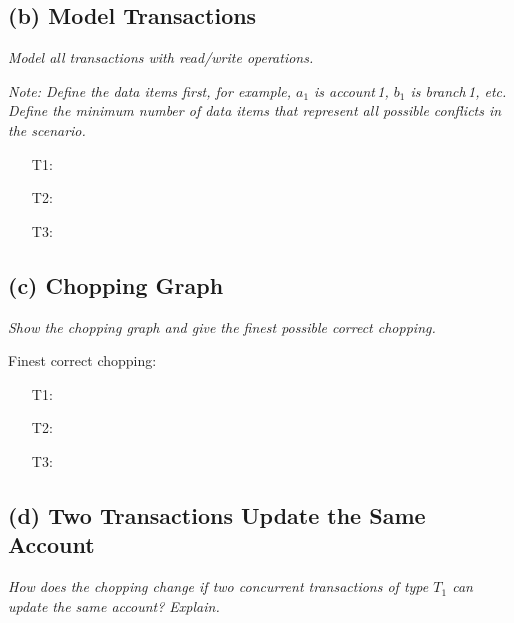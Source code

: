 \documentclass[11pt]{scrartcl}
\begin{document}
\subsection*{(b) Model Transactions}

{\it Model all transactions with read/write operations.}

\smallskip

{\it Note: Define the data items first, for example, $a_1$ is
   account\,1, $b_1$ is branch\,1, etc. Define the minimum number of
  data items that represent all possible conflicts in the scenario.}

\begin{enumerate}
\item[T1:]
\item[T2:]
\item[T3:] 
\end{enumerate}

\subsection*{(c) Chopping Graph}

{\it Show the chopping graph and give the finest possible correct
  chopping.}

\medskip

\noindent
{}

\medskip

\noindent Finest correct chopping:
\begin{enumerate}
\item[T1:]
\item[T2:]
\item[T3:] 
\end{enumerate}

\subsection*{(d) Two Transactions Update the Same Account}

{\it How does the chopping change if two concurrent transactions of type
$T_1$ can update the same account? Explain.}
\end{document}
